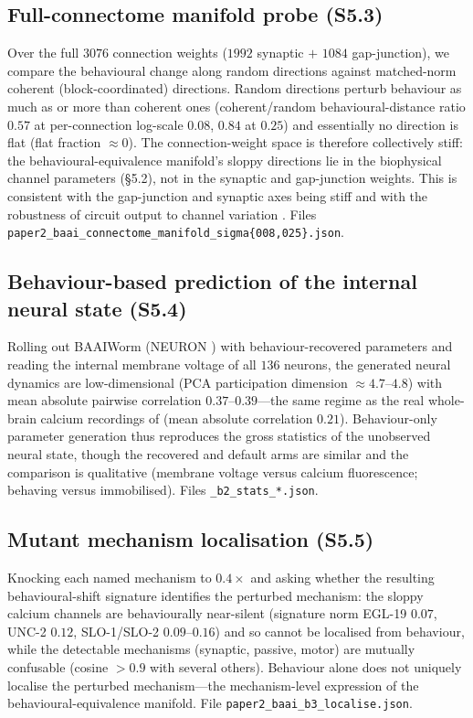 \documentclass[11pt]{article}
\begin{document}
\subsection{Full-connectome manifold probe (S5.3)}
Over the full $3076$ connection weights ($1992$ synaptic $+$ $1084$ gap-junction), we compare the behavioural change along random directions against matched-norm coherent (block-coordinated) directions. Random directions perturb behaviour as much as or more than coherent ones (coherent/random behavioural-distance ratio $0.57$ at per-connection log-scale $0.08$, $0.84$ at $0.25$) and essentially no direction is flat (flat fraction $\approx0$). The connection-weight space is therefore collectively stiff: the behavioural-equivalence manifold's sloppy directions lie in the biophysical channel parameters (\S5.2), not in the synaptic and gap-junction weights. This is consistent with the gap-junction and synaptic axes being stiff and with the robustness of circuit output to channel variation \citep{prinz2004similar,marder2006variability}. Files \texttt{paper2\_baai\_connectome\_manifold\_sigma\{008,025\}.json}.

\subsection{Behaviour-based prediction of the internal neural state (S5.4)}
Rolling out BAAIWorm (NEURON \citep{hines1997neuron}) with behaviour-recovered parameters and reading the internal membrane voltage of all $136$ neurons, the generated neural dynamics are low-dimensional (PCA participation dimension $\approx4.7$--$4.8$) with mean absolute pairwise correlation $0.37$--$0.39$---the same regime as the real whole-brain calcium recordings of \citet{kato2015global} (mean absolute correlation $0.21$). Behaviour-only parameter generation thus reproduces the gross statistics of the unobserved neural state, though the recovered and default arms are similar and the comparison is qualitative (membrane voltage versus calcium fluorescence; behaving versus immobilised). Files \texttt{\_b2\_stats\_*.json}.

\subsection{Mutant mechanism localisation (S5.5)}
Knocking each named mechanism to $0.4\times$ and asking whether the resulting behavioural-shift signature identifies the perturbed mechanism: the sloppy calcium channels are behaviourally near-silent (signature norm EGL-19 $0.07$, UNC-2 $0.12$, SLO-1/SLO-2 $0.09$--$0.16$) and so cannot be localised from behaviour, while the detectable mechanisms (synaptic, passive, motor) are mutually confusable (cosine $>\!0.9$ with several others). Behaviour alone does not uniquely localise the perturbed mechanism---the mechanism-level expression of the behavioural-equivalence manifold. File \texttt{paper2\_baai\_b3\_localise.json}.
\end{document}
